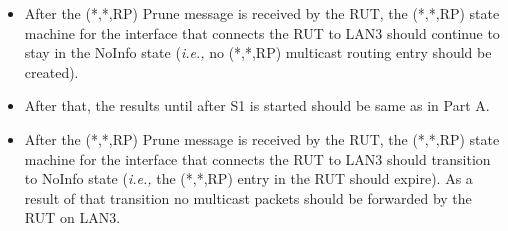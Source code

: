 \documentclass[11pt]{report}
\newcommand{\ie}{\emph{i.e.,}\xspace}
\begin{document}

\begin{itemize}

  \item After the (*,*,RP) Prune message is received by the RUT,
  the (*,*,RP) state machine for the interface that connects the RUT to
  LAN3 should continue to stay in the NoInfo state (\ie no (*,*,RP) multicast
  routing entry should be created).
  
  \item After that, the results until after S1 is started should be same as in
  Part A.

  \item After the (*,*,RP) Prune message is received by the RUT,
  the (*,*,RP) state machine for the interface that connects the RUT to
  LAN3 should transition to NoInfo state
  (\ie the (*,*,RP) entry in the RUT should expire).
  As a result of that transition no multicast packets should be
  forwarded by the RUT on LAN3.

\end{itemize}

\end{document}
